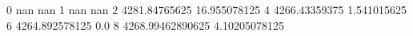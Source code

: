 0 nan nan
1 nan nan
2 4281.84765625 16.955078125
4 4266.43359375 1.541015625
6 4264.892578125 0.0
8 4268.99462890625 4.10205078125
